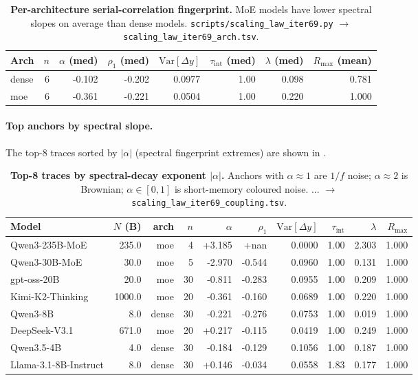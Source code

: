\begin{table}[t]
  \centering
  \small
  \begin{tabular}{lrrrrrrr}
    \toprule
    Arch & $n$ & $\alpha$ (med) & $\rho_1$ (med) & $\mathrm{Var}[\Delta y]$ & $\tau_\mathrm{int}$ (med) & $\lambda$ (med) & $R_\mathrm{max}$ (mean) \\
    \midrule
      dense & 6 & -0.102 & -0.202 & 0.0977 & 1.00 & 0.098 & 0.781 \\
      moe & 6 & -0.361 & -0.221 & 0.0504 & 1.00 & 0.220 & 1.000 \\
    \bottomrule
  \end{tabular}
  \caption{\textbf{Per-architecture serial-correlation fingerprint.}
    MoE models have lower
    spectral slopes on average than dense models.
    \texttt{scripts/scaling\_law\_iter69.py} $\to$
    \texttt{scaling\_law\_iter69\_arch.tsv}.}
  \label{tab:iter69-arch}
\end{table}

\paragraph{Top anchors by spectral slope.}
The top-8 traces sorted by $|\alpha|$ (spectral fingerprint
extremes) are shown in .

\begin{table}[t]
  \centering
  \small
  \begin{tabular}{lrrrrrrrrr}
    \toprule
    Model & $N$ (B) & arch & $n$ & $\alpha$ & $\rho_1$ & $\mathrm{Var}[\Delta y]$ & $\tau_\mathrm{int}$ & $\lambda$ & $R_\mathrm{max}$ \\
    \midrule
      Qwen3-235B-MoE & 235.0 & moe & 4 & +3.185 & +nan & 0.0000 & 1.00 & 2.303 & 1.000 \\
      Qwen3-30B-MoE & 30.0 & moe & 5 & -2.970 & -0.544 & 0.0960 & 1.00 & 0.131 & 1.000 \\
      gpt-oss-20B & 20.0 & moe & 30 & -0.811 & -0.283 & 0.0955 & 1.00 & 0.209 & 1.000 \\
      Kimi-K2-Thinking & 1000.0 & moe & 20 & -0.361 & -0.160 & 0.0689 & 1.00 & 0.220 & 1.000 \\
      Qwen3-8B & 8.0 & dense & 30 & -0.221 & -0.276 & 0.0753 & 1.00 & 0.019 & 1.000 \\
      DeepSeek-V3.1 & 671.0 & moe & 20 & +0.217 & -0.115 & 0.0419 & 1.00 & 0.249 & 1.000 \\
      Qwen3.5-4B & 4.0 & dense & 30 & -0.184 & -0.129 & 0.1056 & 1.00 & 0.187 & 1.000 \\
      Llama-3.1-8B-Instruct & 8.0 & dense & 30 & +0.146 & -0.034 & 0.0558 & 1.83 & 0.177 & 1.000 \\
    \bottomrule
  \end{tabular}
  \caption{\textbf{Top-8 traces by spectral-decay exponent
    $|\alpha|$.}  Anchors with $\alpha \approx 1$ are
    $1/f$ noise; $\alpha \approx 2$ is Brownian; $\alpha \in
    [0, 1]$ is short-memory coloured noise.  $\texttt{...}$ $\to$
    \texttt{scaling\_law\_iter69\_coupling.tsv}.}
  \label{tab:iter69-top-alpha}
\end{table}

